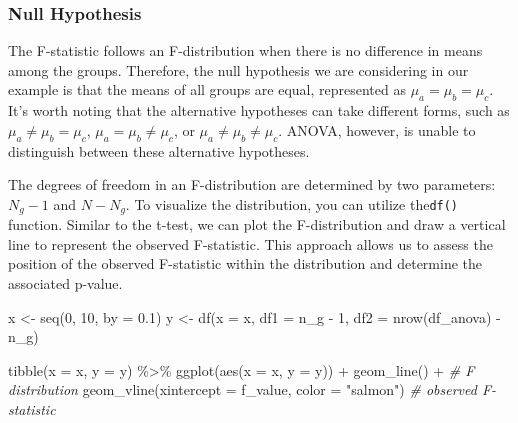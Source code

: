 \documentclass[
]{article}
\newenvironment{Shaded}{\begin{snugshade}}{\end{snugshade}}
\newcommand{\AttributeTok}[1]{\textcolor[rgb]{0.77,0.63,0.00}{#1}}
\newcommand{\CommentTok}[1]{\textcolor[rgb]{0.56,0.35,0.01}{\textit{#1}}}
\newcommand{\DecValTok}[1]{\textcolor[rgb]{0.00,0.00,0.81}{#1}}
\newcommand{\FloatTok}[1]{\textcolor[rgb]{0.00,0.00,0.81}{#1}}
\newcommand{\FunctionTok}[1]{\textcolor[rgb]{0.00,0.00,0.00}{#1}}
\newcommand{\NormalTok}[1]{#1}
\newcommand{\OtherTok}[1]{\textcolor[rgb]{0.56,0.35,0.01}{#1}}
\newcommand{\SpecialCharTok}[1]{\textcolor[rgb]{0.00,0.00,0.00}{#1}}
\newcommand{\StringTok}[1]{\textcolor[rgb]{0.31,0.60,0.02}{#1}}
\begin{document}
\hypertarget{null-hypothesis-1}{%
\subsubsection{Null Hypothesis}\label{null-hypothesis-1}}

The F-statistic follows an F-distribution when there is no difference in means among the groups. Therefore, the null hypothesis we are considering in our example is that the means of all groups are equal, represented as \(\mu_a = \mu_b = \mu_c\). It's worth noting that the alternative hypotheses can take different forms, such as \(\mu_a \ne \mu_b = \mu_c\), \(\mu_a = \mu_b \ne \mu_c\), or \(\mu_a \ne \mu_b \ne \mu_c\). ANOVA, however, is unable to distinguish between these alternative hypotheses.

The degrees of freedom in an F-distribution are determined by two parameters: \(N_g - 1\) and \(N - N_g\). To visualize the distribution, you can utilize the\texttt{df()} function. Similar to the t-test, we can plot the F-distribution and draw a vertical line to represent the observed F-statistic. This approach allows us to assess the position of the observed F-statistic within the distribution and determine the associated p-value.

\begin{Shaded}
\begin{Highlighting}[]
\NormalTok{x }\OtherTok{\textless{}{-}} \FunctionTok{seq}\NormalTok{(}\DecValTok{0}\NormalTok{, }\DecValTok{10}\NormalTok{, }\AttributeTok{by =} \FloatTok{0.1}\NormalTok{)}
\NormalTok{y }\OtherTok{\textless{}{-}} \FunctionTok{df}\NormalTok{(}\AttributeTok{x =}\NormalTok{ x, }\AttributeTok{df1 =}\NormalTok{ n\_g }\SpecialCharTok{{-}} \DecValTok{1}\NormalTok{, }\AttributeTok{df2 =} \FunctionTok{nrow}\NormalTok{(df\_anova) }\SpecialCharTok{{-}}\NormalTok{ n\_g)}

\FunctionTok{tibble}\NormalTok{(}\AttributeTok{x =}\NormalTok{ x, }\AttributeTok{y =}\NormalTok{ y) }\SpecialCharTok{\%\textgreater{}\%} 
  \FunctionTok{ggplot}\NormalTok{(}\FunctionTok{aes}\NormalTok{(}\AttributeTok{x =}\NormalTok{ x,}
             \AttributeTok{y =}\NormalTok{ y)) }\SpecialCharTok{+} 
  \FunctionTok{geom\_line}\NormalTok{() }\SpecialCharTok{+} \CommentTok{\# F distribution}
  \FunctionTok{geom\_vline}\NormalTok{(}\AttributeTok{xintercept =}\NormalTok{ f\_value,}
             \AttributeTok{color =} \StringTok{"salmon"}\NormalTok{) }\CommentTok{\# observed F{-}statistic}
\end{Highlighting}
\end{Shaded}
\end{document}
